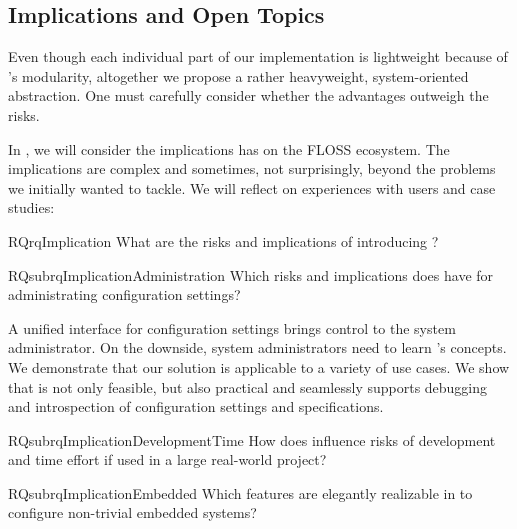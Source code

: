 \subsection{Implications and Open Topics}

Even though each individual part of our implementation is lightweight because of \elektra{}'s modularity, altogether we propose a rather heavyweight, system-oriented abstraction.
One must carefully consider whether the advantages outweigh the risks.

In , we will consider the implications \elektra{} has on the FLOSS ecosystem.
The implications are complex and sometimes, not surprisingly, beyond the problems we initially wanted to tackle.
We will reflect on experiences with users and case studies:

\begin{restatable}{RQ}{rqImplication}
What are the risks and implications of introducing \elektra{}?%
\label{rq:implication}
\end{restatable}

\begin{restatable}{RQsub}{rqImplicationAdministration}
Which risks and implications does \elektra{} have for administrating configuration settings?%
\label{rq:implication-administration}
\end{restatable}

\begin{contribution}
A unified interface for configuration settings brings control to the system administrator.
On the downside, system administrators need to learn \elektra{}'s concepts.
We demonstrate that our solution is applicable to a variety of use cases.
We show that \elektra{} is not only feasible, but also practical and seamlessly supports debugging and introspection of configuration settings and specifications.
\end{contribution}

\begin{restatable}{RQsub}{rqImplicationDevelopmentTime}
How does \elektra{} influence risks of development and time effort if used in a large real-world project?%
\label{rq:implication-development-time}
\end{restatable}

\begin{restatable}{RQsub}{rqImplicationEmbedded}
\label{rq:implication-embedded}
Which features are elegantly realizable in \elektra{} to configure non-trivial embedded systems?
\end{restatable}

